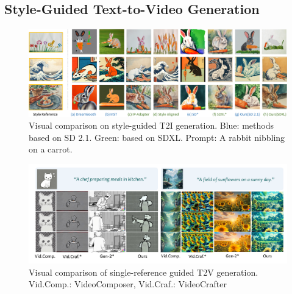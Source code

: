 \subsection{Style-Guided Text-to-Video Generation}
\label{subsec:video_eval}

\begin{figure}[t!]
    \centering
    \includegraphics[width=0.87\linewidth]{figures/comp_image.pdf}
    \vspace{-1em}
    \caption{Visual comparison on style-guided T2I generation. \textcolor[RGB]{46, 117, 182}{Blue}: methods based on SD 2.1. \textcolor[RGB]{84, 130, 53}{Green}: based on SDXL. Prompt: A rabbit nibbling on a carrot.} 
    \label{fig:result_img}
    \vspace{-1em}
\end{figure}
%
\begin{figure}[!h]
    \centering
    \includegraphics[width=0.9\linewidth]{figures/comp_video.pdf}\vspace{-1.5em}
    \caption{Visual comparison of single-reference guided T2V generation. Vid.Comp.: VideoComposer, Vid.Craf.: VideoCrafter
    } 
    \label{fig:result_video}
    \vspace{-1em}
\end{figure}
%
